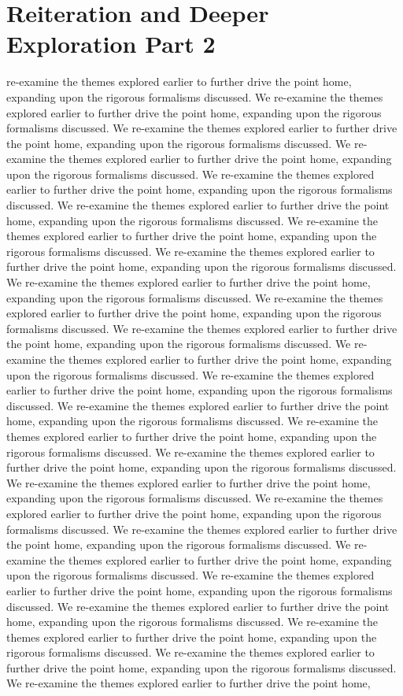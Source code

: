 \section{Reiteration and Deeper Exploration Part 2}\nWe re-examine the themes explored earlier to further drive the point home, expanding upon the rigorous formalisms discussed. We re-examine the themes explored earlier to further drive the point home, expanding upon the rigorous formalisms discussed. We re-examine the themes explored earlier to further drive the point home, expanding upon the rigorous formalisms discussed. We re-examine the themes explored earlier to further drive the point home, expanding upon the rigorous formalisms discussed. We re-examine the themes explored earlier to further drive the point home, expanding upon the rigorous formalisms discussed. We re-examine the themes explored earlier to further drive the point home, expanding upon the rigorous formalisms discussed. We re-examine the themes explored earlier to further drive the point home, expanding upon the rigorous formalisms discussed. We re-examine the themes explored earlier to further drive the point home, expanding upon the rigorous formalisms discussed. We re-examine the themes explored earlier to further drive the point home, expanding upon the rigorous formalisms discussed. We re-examine the themes explored earlier to further drive the point home, expanding upon the rigorous formalisms discussed. We re-examine the themes explored earlier to further drive the point home, expanding upon the rigorous formalisms discussed. We re-examine the themes explored earlier to further drive the point home, expanding upon the rigorous formalisms discussed. We re-examine the themes explored earlier to further drive the point home, expanding upon the rigorous formalisms discussed. We re-examine the themes explored earlier to further drive the point home, expanding upon the rigorous formalisms discussed. We re-examine the themes explored earlier to further drive the point home, expanding upon the rigorous formalisms discussed. We re-examine the themes explored earlier to further drive the point home, expanding upon the rigorous formalisms discussed. We re-examine the themes explored earlier to further drive the point home, expanding upon the rigorous formalisms discussed. We re-examine the themes explored earlier to further drive the point home, expanding upon the rigorous formalisms discussed. We re-examine the themes explored earlier to further drive the point home, expanding upon the rigorous formalisms discussed. We re-examine the themes explored earlier to further drive the point home, expanding upon the rigorous formalisms discussed. We re-examine the themes explored earlier to further drive the point home, expanding upon the rigorous formalisms discussed. We re-examine the themes explored earlier to further drive the point home, expanding upon the rigorous formalisms discussed. We re-examine the themes explored earlier to further drive the point home, expanding upon the rigorous formalisms discussed. We re-examine the themes explored earlier to further drive the point home, expanding upon the rigorous formalisms discussed. We re-examine the themes explored earlier to further drive the point home, 